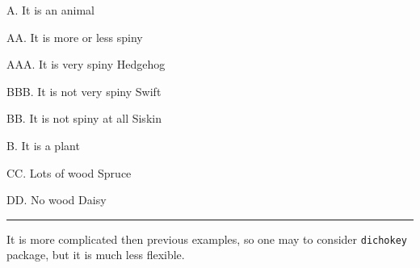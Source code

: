 \documentclass{article}
\begin{document}
\Z A. It is an animal

\begin{LE}

\Z AA. It is more or less spiny

\begin{LE}[2]

\Z AAA. It is very spiny \TT Hedgehog

\Z BBB.  It is not very spiny \TT Swift

\end{LE}

\Z BB. It is not spiny at all \TT Siskin

\end{LE}

\Z B. It is a plant

\begin{LE}

\Z CC. Lots of wood \TT Spruce

\Z DD. No wood \TT Daisy

\end{LE}

\bigskip\hrule\bigskip

It is more complicated then previous examples, so one may to consider \texttt{dichokey} package, but it is much less flexible.
\end{document}
